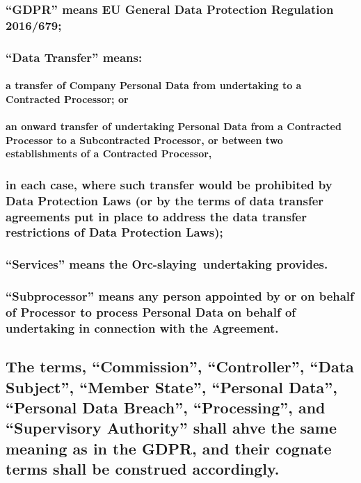 \documentclass[a4paper]{article}
\newcommand{\services}{Orc-slaying}
\begin{document}
\subsubsection{\textbf{``GDPR''} means EU General Data Protection Regulation 2016/679;}

\subsubsection{\textbf{``Data Transfer''} means:}

\paragraph{a transfer of Company Personal Data from \gls{undertaking} to a Contracted Processor; or}

\paragraph{an onward transfer of \gls{undertaking} Personal Data from a Contracted Processor to a Subcontracted Processor, or between two establishments of a Contracted Processor,}

\noindent
\subsubsection*{in each case, where such transfer would be prohibited by Data Protection Laws (or by the terms of data transfer agreements put in place to address the data transfer restrictions of Data Protection Laws);}

\subsubsection{\textbf{``Services''} means the \services\ \gls{undertaking} provides.}

\subsubsection{\textbf{``Subprocessor''} means any person appointed by or on behalf of Processor to process Personal Data on behalf of \gls{undertaking} in connection with the Agreement.}

\subsection*{The terms, \textbf{``Commission''}, \textbf{``Controller''}, \textbf{``Data Subject''}, \textbf{``Member State''}, \textbf{``Personal Data''}, \textbf{``Personal Data Breach''}, \textbf{``Processing''}, and \textbf{``Supervisory Authority''} shall ahve the same meaning as in the GDPR, and their cognate terms shall be construed accordingly.}
\end{document}
